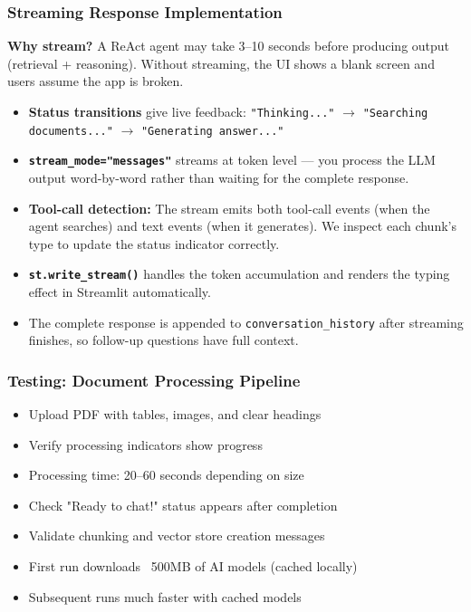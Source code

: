 

\begin{frame}[fragile]\frametitle{Streaming Response Implementation}

\textbf{Why stream?} A ReAct agent may take 3--10 seconds before producing output (retrieval + reasoning). Without streaming, the UI shows a blank screen and users assume the app is broken.

      \begin{itemize}
        \item \textbf{Status transitions} give live feedback: \texttt{"Thinking..."} $\rightarrow$ \texttt{"Searching documents..."} $\rightarrow$ \texttt{"Generating answer..."}
        \item \textbf{\texttt{stream\_mode="messages"}} streams at token level --- you process the LLM output word-by-word rather than waiting for the complete response.
        \item \textbf{Tool-call detection:} The stream emits both tool-call events (when the agent searches) and text events (when it generates). We inspect each chunk's type to update the status indicator correctly.
        \item \textbf{\texttt{st.write\_stream()}} handles the token accumulation and renders the typing effect in Streamlit automatically.
        \item The complete response is appended to \texttt{conversation\_history} after streaming finishes, so follow-up questions have full context.
      \end{itemize}
\end{frame}

\begin{frame}[fragile]\frametitle{Testing: Document Processing Pipeline}
      \begin{itemize}
        \item Upload PDF with tables, images, and clear headings
        \item Verify processing indicators show progress
        \item Processing time: 20–60 seconds depending on size
        \item Check "Ready to chat!" status appears after completion
        \item Validate chunking and vector store creation messages
        \item First run downloads ~500MB of AI models (cached locally)
        \item Subsequent runs much faster with cached models
      \end{itemize}
\end{frame}

